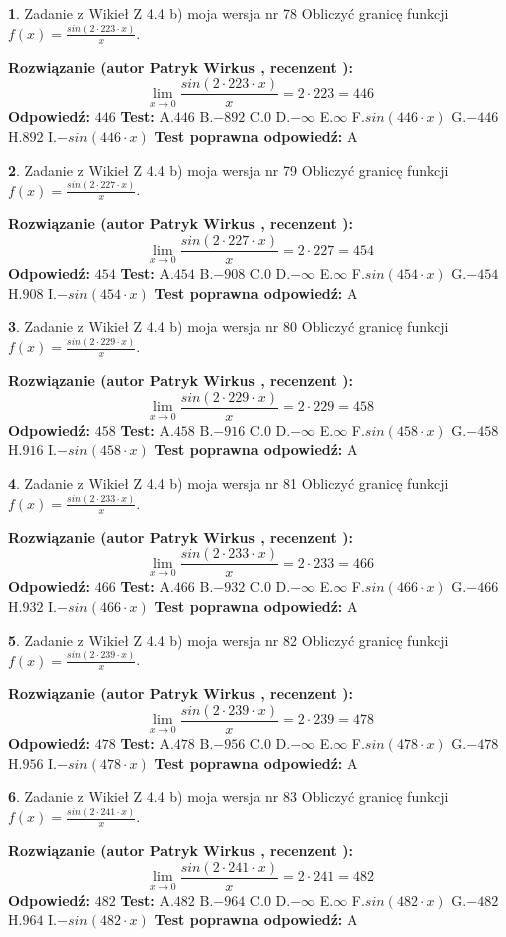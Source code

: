 \documentclass[12pt, a4paper]{article}
\theoremstyle{definition} %
\newtheorem{zad}{}
\newcommand{\zadStart}[1]{\begin{zad}#1\newline}
\newcommand{\zadStop}{\end{zad}}
\newcommand{\rozwStart}[2]{\noindent \textbf{Rozwiązanie (autor #1 , recenzent #2): }\newline}
\newcommand{\rozwStop}{\newline}
\newcommand{\odpStart}{\noindent \textbf{Odpowiedź:}\newline}
\newcommand{\odpStop}{\newline}
\newcommand{\testStart}{\noindent \textbf{Test:}\newline}
\newcommand{\testStop}{\newline}
\newcommand{\kluczStart}{\noindent \textbf{Test poprawna odpowiedź:}\newline}
\newcommand{\kluczStop}{\newline}
\begin{document}
\zadStart{Zadanie z Wikieł Z 4.4 b) moja wersja nr 78}
Obliczyć granicę funkcji $f(x)=\frac{sin(2 \cdot223\cdot x)}{x}$.
\zadStop
\rozwStart{Patryk Wirkus}{}
$$\lim\limits_{x\to 0}\frac{sin(2 \cdot 223\cdot x)}{x}=
2 \cdot 223 = 446$$
\rozwStop
\odpStart
$446$
\odpStop
\testStart
A.$446$
B.$-892$
C.$0$
D.$-\infty$
E.$\infty$
F.$sin(446\cdot x)$
G.$-446$
H.$892$
I.$-sin(446\cdot x)$
\testStop
\kluczStart
A
\kluczStop



\zadStart{Zadanie z Wikieł Z 4.4 b) moja wersja nr 79}
Obliczyć granicę funkcji $f(x)=\frac{sin(2 \cdot227\cdot x)}{x}$.
\zadStop
\rozwStart{Patryk Wirkus}{}
$$\lim\limits_{x\to 0}\frac{sin(2 \cdot 227\cdot x)}{x}=
2 \cdot 227 = 454$$
\rozwStop
\odpStart
$454$
\odpStop
\testStart
A.$454$
B.$-908$
C.$0$
D.$-\infty$
E.$\infty$
F.$sin(454\cdot x)$
G.$-454$
H.$908$
I.$-sin(454\cdot x)$
\testStop
\kluczStart
A
\kluczStop



\zadStart{Zadanie z Wikieł Z 4.4 b) moja wersja nr 80}
Obliczyć granicę funkcji $f(x)=\frac{sin(2 \cdot229\cdot x)}{x}$.
\zadStop
\rozwStart{Patryk Wirkus}{}
$$\lim\limits_{x\to 0}\frac{sin(2 \cdot 229\cdot x)}{x}=
2 \cdot 229 = 458$$
\rozwStop
\odpStart
$458$
\odpStop
\testStart
A.$458$
B.$-916$
C.$0$
D.$-\infty$
E.$\infty$
F.$sin(458\cdot x)$
G.$-458$
H.$916$
I.$-sin(458\cdot x)$
\testStop
\kluczStart
A
\kluczStop



\zadStart{Zadanie z Wikieł Z 4.4 b) moja wersja nr 81}
Obliczyć granicę funkcji $f(x)=\frac{sin(2 \cdot233\cdot x)}{x}$.
\zadStop
\rozwStart{Patryk Wirkus}{}
$$\lim\limits_{x\to 0}\frac{sin(2 \cdot 233\cdot x)}{x}=
2 \cdot 233 = 466$$
\rozwStop
\odpStart
$466$
\odpStop
\testStart
A.$466$
B.$-932$
C.$0$
D.$-\infty$
E.$\infty$
F.$sin(466\cdot x)$
G.$-466$
H.$932$
I.$-sin(466\cdot x)$
\testStop
\kluczStart
A
\kluczStop



\zadStart{Zadanie z Wikieł Z 4.4 b) moja wersja nr 82}
Obliczyć granicę funkcji $f(x)=\frac{sin(2 \cdot239\cdot x)}{x}$.
\zadStop
\rozwStart{Patryk Wirkus}{}
$$\lim\limits_{x\to 0}\frac{sin(2 \cdot 239\cdot x)}{x}=
2 \cdot 239 = 478$$
\rozwStop
\odpStart
$478$
\odpStop
\testStart
A.$478$
B.$-956$
C.$0$
D.$-\infty$
E.$\infty$
F.$sin(478\cdot x)$
G.$-478$
H.$956$
I.$-sin(478\cdot x)$
\testStop
\kluczStart
A
\kluczStop



\zadStart{Zadanie z Wikieł Z 4.4 b) moja wersja nr 83}
Obliczyć granicę funkcji $f(x)=\frac{sin(2 \cdot241\cdot x)}{x}$.
\zadStop
\rozwStart{Patryk Wirkus}{}
$$\lim\limits_{x\to 0}\frac{sin(2 \cdot 241\cdot x)}{x}=
2 \cdot 241 = 482$$
\rozwStop
\odpStart
$482$
\odpStop
\testStart
A.$482$
B.$-964$
C.$0$
D.$-\infty$
E.$\infty$
F.$sin(482\cdot x)$
G.$-482$
H.$964$
I.$-sin(482\cdot x)$
\testStop
\kluczStart
A
\kluczStop
\end{document}
